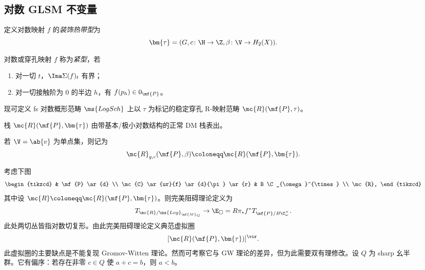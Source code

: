 \subsection{对数 GLSM 不变量}%
\label{sub:Log GLSM invariants}

\begin{defn}
    定义对数映射 \(f\) 的\textit{装饰热带型}为
    \[ \bm{\tau} = (G, c \colon \H \to \Z, \beta \colon \V \to H_2(X)). \]
\end{defn}

\begin{defn}
    对数或穿孔映射 \(f\) 称为\textit{紧型}，若
    \begin{enumerate}
        \item 对一切 \(t\)，\(\Ima \Sigma(f)_t\) 有界；
        \item 对一切接触阶为 \(0\) 的半边 \(h\)，有 \(f(p_h) \in 0_{\mf{P}}\)。
    \end{enumerate}
\end{defn}

现可定义 fs 对数概形范畴 \(\ms{LogSch}\) 上以 \(\tau\) 为标记的稳定穿孔 R-映射范畴 \(\mc{R}(\mf{P}, \tau)\)。

\begin{thm}
    栈 \(\mc{R}(\mf{P},\bm{\tau})\) 由带基本/极小对数结构的正常 DM 栈表出。
\end{thm}

\begin{rmk}
    若 \(\V = \ab\{v\}\) 为单点集，则记为
    \[ \mc{R}_{g, c}(\mf{P}, \beta) \coloneqq \mc{R}(\mf{P}, \bm{\tau}). \]
\end{rmk}

考虑下图
\begin{equation*}
\begin{tikzcd}
    & \mf{P} \ar{d} \\
    \mc{C} \ar{ur}{f} \ar{d}{\pi} \ar{r} & B \C_{\omega}^{\times} \\
    \mc{R},
\end{tikzcd}
\end{equation*}
其中设 \(\mc{R} \coloneqq \mc{R}(\mf{P}, \bm{\tau})\)。则完美阻碍理论定义为
\[ T_{\mc{R}/\ms{Log}_{\mf{M}_G}} \to \E_{\square} = R \pi_* f^* T_{\mf{P}/B\C_{\omega}^{\times}}. \]
此处两切丛皆指对数切复形。由此完美阻碍理论定义典范虚拟圈
\[ [\mc{R}(\mf{P}, \bm{\tau})]^{\vir}. \]
此虚拟圈的主要缺点是不能复现 Gromov-Witten 理论。然而可考察它与 GW 理论的差异，但为此需要双有理修改。设 \(Q\) 为 sharp 幺半群。它有偏序：若存在非零 \(c \in Q\) 使 \(a+c = b\)，则 \(a < b\)。

